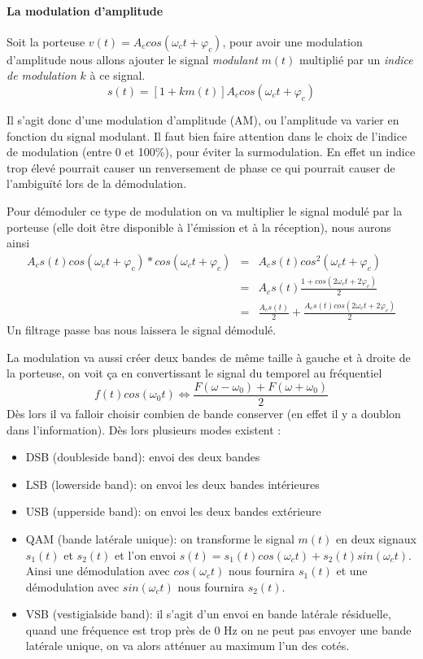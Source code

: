 \paragraph{La modulation d'amplitude}

Soit la porteuse $v(t) = A_c cos(\omega_c t + \varphi_c)$, pour avoir une modulation d'amplitude nous allons ajouter le signal \textit{modulant} $m(t)$ multiplié par un \textit{indice de modulation} $k$ à ce signal.  $$s(t) = [1+km(t)] A_c cos(\omega_c t + \varphi_c)$$

Il s'agit donc d'une modulation d'amplitude (AM), ou l'amplitude va varier en fonction du signal modulant. Il faut bien faire attention dans le choix de l'indice de modulation (entre 0 et 100\%), pour éviter la surmodulation. En effet un indice trop élevé pourrait causer un renversement de phase ce qui pourrait causer de l'ambiguïté lors de la démodulation.

Pour démoduler ce type de modulation on va multiplier le signal modulé par la porteuse (elle doit être disponible à l'émission et à la réception), nous aurons ainsi \begin{eqnarray*} A_c s(t)cos(\omega_c t + \varphi_c)*cos(\omega_c t + \varphi_c) &=&A_c s(t)cos^2(\omega_c t + \varphi_c)\\ &=& A_c s(t) \frac{1+ cos(2\omega_c t + 2\varphi_c)}{2}\\ &=& \frac{A_cs(t)}{2} + \frac{A_cs(t)cos(2\omega_c t + 2\varphi_c)}{2} \end{eqnarray*}
Un filtrage passe bas nous laissera le signal démodulé.

La modulation va aussi créer deux bandes de même taille à gauche et à droite de la porteuse, on voit ça en convertissant le signal du temporel au fréquentiel $$f(t) cos(\omega_0 t) \Leftrightarrow \frac{F(\omega - \omega_0) + F(\omega + \omega_0)}{2}$$ Dès lors il va falloir choisir combien de bande conserver (en effet il y a doublon dans l'information). Dès lors plusieurs modes existent :

\begin{itemize}
\item DSB (doubleside band): envoi des deux bandes
\item LSB (lowerside band): on envoi les deux bandes intérieures
\item USB (upperside band): on envoi les deux bandes extérieure
\item QAM (bande latérale unique): on transforme le signal $m(t)$ en
    deux signaux $s_1(t)$ et $s_2(t)$ et l'on envoi $s(t) = s_1(t) cos(\omega_c t) + s_2(t) sin(\omega_c t)$. Ainsi une démodulation avec $cos(\omega_c t)$ nous fournira $s_1(t)$ et une démodulation avec $sin(\omega_c t)$ nous fournira $s_2(t)$. 
\item VSB (vestigialside band): il s'agit d'un envoi en bande latérale résiduelle, quand une fréquence est trop près de 0 Hz on ne peut pas envoyer une bande latérale unique, on va alors atténuer au maximum l'un des cotés.
\end{itemize}

